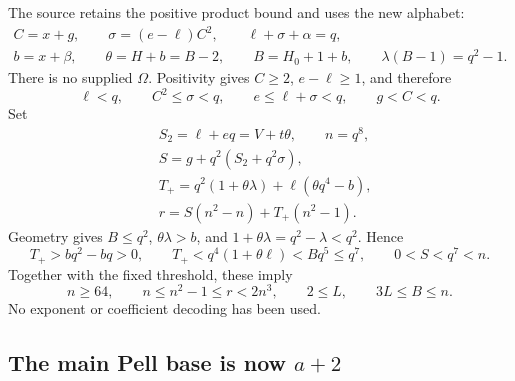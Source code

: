 The source retains the positive product bound and uses the new alphabet:
\begin{equation}\label{eq:binary-product-source}
\begin{gathered}
 C=x+g,\qquad \sigma=(e-\ell)C^2,\qquad
 \ell+\sigma+\alpha=q,\\
 b=x+\beta,\qquad \theta=H+b=B-2,\qquad
 B=H_0+1+b,\qquad \lambda(B-1)=q^2-1.
\end{gathered}
\end{equation}
There is no supplied $\Omega$. Positivity gives $C\ge2$, $e-\ell\ge1$,
and therefore
\begin{equation}\label{eq:binary-product-ranges}
 \ell<q,\qquad C^2\le\sigma<q,\qquad
 e\le\ell+\sigma<q,\qquad g<C<q.
\end{equation}
Set
\begin{equation}\label{eq:binary-product-packing}
\begin{aligned}
 &S_2=\ell+eq=V+t\theta,\qquad n=q^8,\\
 &S=g+q^2(S_2+q^2\sigma),\\
 &T_+=q^2(1+\theta\lambda)+\ell(\theta q^4-b),\\
 &r=S(n^2-n)+T_+(n^2-1).
\end{aligned}
\end{equation}
Geometry gives $B\le q^2$, $\theta\lambda>b$, and
$1+\theta\lambda=q^2-\lambda<q^2$. Hence
\[
 T_+>bq^2-bq>0,\qquad
 T_+<q^4(1+\theta\ell)<Bq^5\le q^7,
 \qquad 0<S<q^7<n.
\]
Together with the fixed threshold, these imply
\begin{equation}\label{eq:binary-product-preliminary}
 n\ge64,\qquad n\le n^2-1\le r<2n^3,\qquad
 2\le L,\qquad 3L\le B\le n.
\end{equation}
No exponent or coefficient decoding has been used.

\subsection{The main Pell base is now \texorpdfstring{$a+2$}{a+2}}

